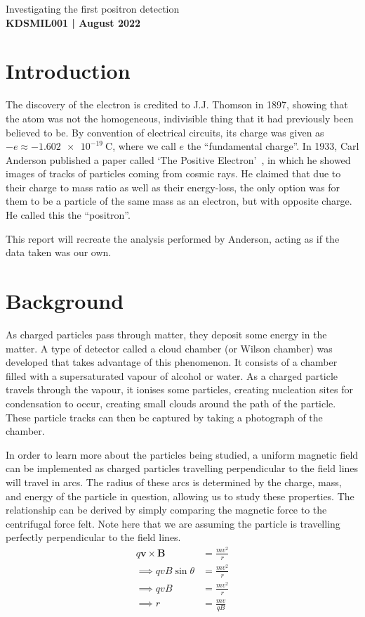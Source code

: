 \documentclass[11pt]{article}
\newcommand{\mb}[1]{\mathbf{#1}}
\numberwithin{equation}{section}
\numberwithin{figure}{section}
\numberwithin{table}{section}
\begin{document}
\begin{center}
    {\huge Investigating the first positron detection}\\
    \vspace{0.2in}
    \textbf{KDSMIL001 | August 2022}
    
\end{center}

\section{Introduction}\label{sec:Introduction}
The discovery of the electron is credited to J.J. Thomson in 1897, showing that the atom was not the homogeneous, indivisible thing that it had previously been believed to be. By convention of electrical circuits, its charge was given as $-e\approx-\SI{1.602e-19}{\coulomb}$, where we call $e$ the ``fundamental charge''. In 1933, Carl Anderson published a paper called `The Positive Electron'~\cite{Pos_Electron}, in which he showed images of tracks of particles coming from cosmic rays. He claimed that due to their charge to mass ratio as well as their energy-loss, the only option was for them to be a particle of the same mass as an electron, but with opposite charge. He called this the ``positron''. 

This report will recreate the analysis performed by Anderson, acting as if the data taken was our own.

\section{Background}\label{sec:Background}
As charged particles pass through matter, they deposit some energy in the matter. A type of detector called a cloud chamber (or Wilson chamber) was developed that takes advantage of this phenomenon. It consists of a chamber filled with a supersaturated vapour of alcohol or water. As a charged particle travels through the vapour, it ionises some particles, creating nucleation sites for condensation to occur, creating small clouds around the path of the particle. These particle tracks can then be captured by taking a photograph of the chamber.

In order to learn more about the particles being studied, a uniform magnetic field can be implemented as charged particles travelling perpendicular to the field lines will travel in arcs. The radius of these arcs is determined by the charge, mass, and energy of the particle in question, allowing us to study these properties. The relationship can be derived by simply comparing the magnetic force to the centrifugal force felt. Note here that we are assuming the particle is travelling perfectly perpendicular to the field lines.
\begin{align*}
    q \mb{v}\times\mb{B}&=\frac{mv^2}{r}\\
    \implies qvB\sin\theta&=\frac{mv^2}{r}\\
    \implies qvB&=\frac{mv^2}{r}\\
    \implies r&=\frac{mv}{qB}
\end{align*}
\end{document}
